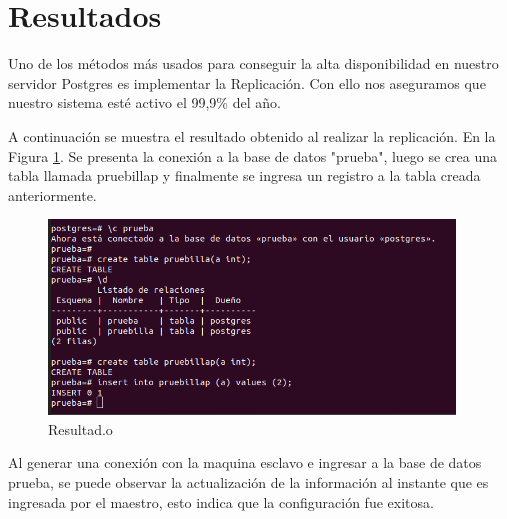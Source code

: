 \section{Resultados}

Uno de los métodos más usados para conseguir la alta disponibilidad en nuestro servidor Postgres es implementar la Replicación. Con ello nos aseguramos que nuestro sistema esté activo el 99,9\% del año.

A continuación se muestra el resultado obtenido al realizar la replicación. En la Figura \ref{fig:prueba1}. Se presenta la conexión a la base de datos "prueba", luego se crea una tabla llamada pruebillap y finalmente se ingresa un registro a la tabla creada anteriormente. 

\begin{figure}[H]
\centering
\includegraphics[width=\columnwidth]{gResult/prueba1}
\caption{Resultad.o}\label{fig:prueba1}
\end{figure}

Al generar una conexión con la maquina esclavo e ingresar a la base de datos prueba, se puede observar la actualización de la información al instante que es ingresada por el maestro, esto indica que la configuración fue exitosa. 





